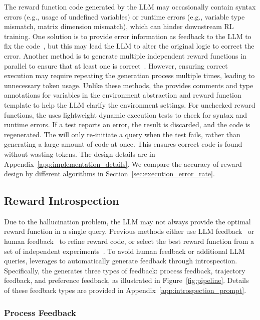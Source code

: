 \documentclass{article}
\theoremstyle{plain}
\theoremstyle{definition}
\theoremstyle{remark}
\begin{document}
The reward function code generated by the LLM may occasionally contain syntax errors (e.g., usage of undefined variables) or runtime errors (e.g., variable type mismatch, matrix dimension mismatch), which can hinder downstream RL training. One solution is to provide error information as feedback to the LLM to fix the code~\cite{le2022coderl,olausson2023demystifying}, but this may lead the LLM to alter the original logic to correct the error. Another method is to generate multiple independent reward functions in parallel to ensure that at least one is correct~\cite{Eureka}. However, ensuring correct execution may require repeating the generation process multiple times, leading to unnecessary token usage. Unlike these methods, the \designer provides comments and type annotations for variables in the environment abstraction and reward function template to help the LLM clarify the environment settings. For unchecked reward functions, the \designer uses lightweight dynamic execution tests to check for syntax and runtime errors. If a test reports an error, the result is discarded, and the code is regenerated. The \designer will only re-initiate a query when the test fails, rather than generating a large amount of code at once. This ensures correct code is found without wasting tokens. The design details are in Appendix~\ref{app:implementation_details}. We compare the accuracy of reward design by different algorithms in Section~\ref{sec:execution_error_rate}.

\subsection{Reward Introspection}\label{sec:reward_introspection}


Due to the hallucination problem, the LLM may not always provide the optimal reward function in a single query. Previous methods either use LLM feedback~\cite{li2024auto} or human feedback~\cite{Text2Reward} to refine reward code, or select the best reward function from a set of independent experiments~\cite{Eureka}. To avoid human feedback or additional LLM queries, \ourmethod leverages \critic to automatically generate feedback through introspection. 
Specifically, the \critic generates three types of feedback: process feedback, trajectory feedback, and preference feedback, as illustrated in Figure~\ref{fig:pipeline}. Details of these feedback types are provided in Appendix~\ref{app:introspection_prompt}.


\subsubsection{Process Feedback}
\end{document}
